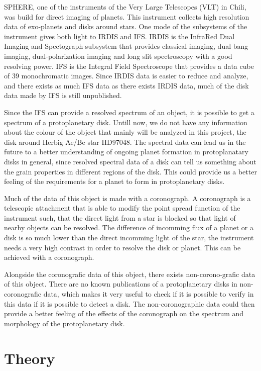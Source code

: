 \documentclass[twoside,single]{lion-msc}
\begin{document}
SPHERE, one of the instruments of the Very Large Telescopes (VLT) in Chili, was build for direct imaging of planets. This instrument collects high resolution data of exo-planets and disks around stars. One mode of the subsystems of the instrument gives both light to IRDIS and IFS. IRDIS is the InfraRed Dual Imaging and Spectograph subsystem that provides classical imaging, dual bang imaging, dual-polarization imaging and long slit spectroscopy with a good resolving power. IFS is the Integral Field Spectroscope that provides a data cube of 39 monochromatic images. \cite{Observatory2007} Since IRDIS data is easier to reduce and analyze, and there exists as much IFS data as there exists IRDIS data, much of the disk data made by IFS is still unpublished. 
\bigskip

Since the IFS can provide a resolved spectrum of an object, it is possible to get a spectrum of a protoplanetary disk. Untill now, we do not have any information about the colour of the object that mainly will be analyzed in this project, the disk around Herbig Ae/Be star HD97048. The spectral data can lead us in the future to a better understanding of ongoing planet formation in protoplanatary disks in general, since resolved spectral data of a disk can tell us something about the grain properties in different regions of the disk. This could provide us a better feeling of the requirements for a planet to form in protoplanetary disks. 
\bigskip

Much of the data of this object is made with a coronograph. A coronograph is a telescopic attachment that is able to modify the point spread function of the instrument such, that the direct light from a star is blocked so that light of nearby objects can be resolved. The difference of incomming flux of a planet or a disk is so much lower than the direct incomming light of the star, the instrument needs a very high contrast in order to resolve the disk or planet. This can be achieved with a coronograph.

\bigskip
Alongside the coronografic data of this object, there exists non-corono-grafic data of this object. There are no known publications of a protoplanetary disks in non-coronografic data, which makes it very useful to check if it is possible to verify in this data if it is possible to detect a disk. The non-coronographic data could then provide a better feeling of the effects of the coronograph on the spectrum and morphology of the protoplanetary disk.


\chapter{Theory}
\end{document}
